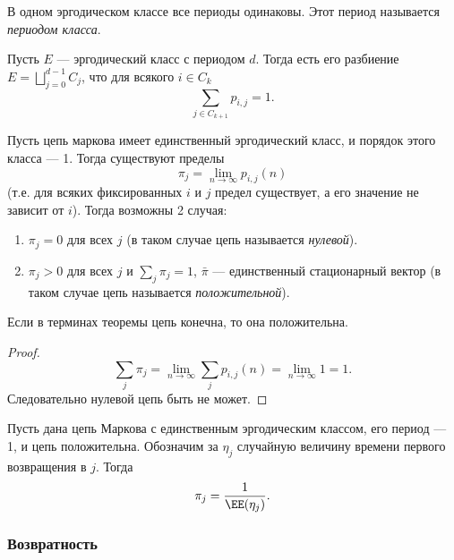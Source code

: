 \documentclass[12pt,a4paper]{article}
\begin{document}
    \begin{corollary}
        В одном эргодическом классе все периоды одинаковы. Этот период называется \emph{периодом класса}.
    \end{corollary}

    \begin{theorem}
        Пусть $E$ --- эргодический класс с периодом $d$. Тогда есть его разбиение $E = \bigsqcup_{j=0}^{d-1} C_j$, что для всякого $i \in C_k$
        \[\sum_{j \in C_{k+1}} p_{i, j} = 1.\]
    \end{theorem}
    
    \begin{theorem}
        Пусть цепь маркова имеет единственный эргодический класс, и порядок этого класса --- 1. Тогда существуют пределы
        \[\pi_j = \lim_{n \to \infty} p_{i, j}(n)\]
        (т.е. для всяких фиксированных $i$ и $j$ предел существует, а его значение не зависит от $i$). Тогда возможны 2 случая:
        \begin{enumerate}
            \item $\pi_j = 0$ для всех $j$ (в таком случае цепь называется \emph{нулевой}).
            \item $\pi_j > 0$ для всех $j$ и $\sum_{j} \pi_j = 1$, $\bar{\pi}$ --- единственный стационарный вектор (в таком случае цепь называется \emph{положительной}).
        \end{enumerate}
    \end{theorem}

    \begin{corollary}
        Если в терминах теоремы цепь конечна, то она положительна.
    \end{corollary}

    \begin{proof}
        \[\sum_j \pi_j = \lim_{n \to \infty} \sum_j p_{i, j}(n) = \lim_{n \to \infty} 1 = 1.\]
        Следовательно нулевой цепь быть не может.
    \end{proof}

    \begin{theorem}[анонс]
        Пусть дана цепь Маркова с единственным эргодическим классом, его период --- 1, и цепь положительна. Обозначим за $\eta_j$ случайную величину времени первого возвращения в $j$. Тогда
        \[\pi_j = \frac{1}{\EE(\eta_j)}.\]
    \end{theorem}

    \subsubsection{Возвратность}
\end{document}
